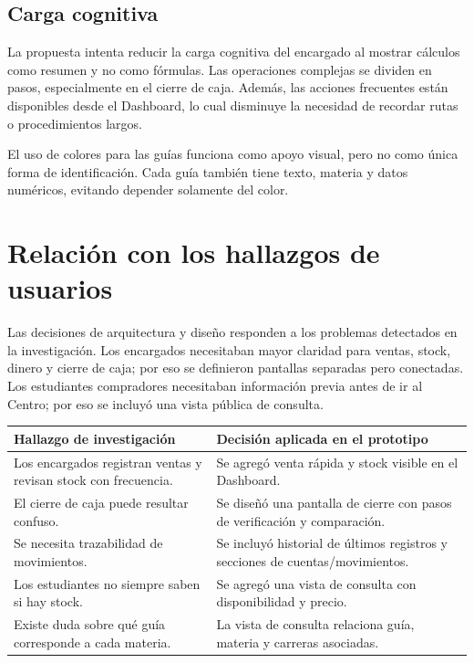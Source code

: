 ﻿\documentclass[12pt,letterpaper]{article}
\begin{document}
\subsection{Carga cognitiva}

La propuesta intenta reducir la carga cognitiva del encargado al mostrar cálculos como resumen y no como fórmulas. Las operaciones complejas se dividen en pasos, especialmente en el cierre de caja. Además, las acciones frecuentes están disponibles desde el Dashboard, lo cual disminuye la necesidad de recordar rutas o procedimientos largos.

El uso de colores para las guías funciona como apoyo visual, pero no como única forma de identificación. Cada guía también tiene texto, materia y datos numéricos, evitando depender solamente del color.

\section{Relación con los hallazgos de usuarios}

Las decisiones de arquitectura y diseño responden a los problemas detectados en la investigación. Los encargados necesitaban mayor claridad para ventas, stock, dinero y cierre de caja; por eso se definieron pantallas separadas pero conectadas. Los estudiantes compradores necesitaban información previa antes de ir al Centro; por eso se incluyó una vista pública de consulta.

\begin{center}
\begin{tabularx}{\textwidth}{|B{5cm}|Y|}
\hline
Hallazgo de investigación & Decisión aplicada en el prototipo \\
\hline
Los encargados registran ventas y revisan stock con frecuencia. & Se agregó venta rápida y stock visible en el Dashboard. \\
\hline
El cierre de caja puede resultar confuso. & Se diseñó una pantalla de cierre con pasos de verificación y comparación. \\
\hline
Se necesita trazabilidad de movimientos. & Se incluyó historial de últimos registros y secciones de cuentas/movimientos. \\
\hline
Los estudiantes no siempre saben si hay stock. & Se agregó una vista de consulta con disponibilidad y precio. \\
\hline
Existe duda sobre qué guía corresponde a cada materia. & La vista de consulta relaciona guía, materia y carreras asociadas. \\
\hline
\end{tabularx}
\end{center}
\end{document}
